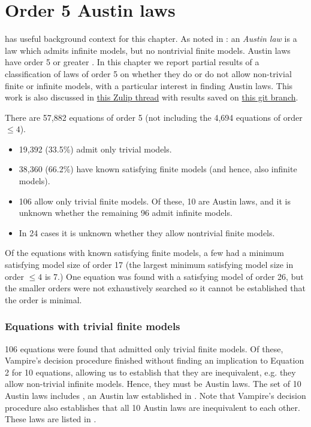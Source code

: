 \chapter{Order 5 Austin laws}\label{order-5-austin-laws}

 has useful background context for this chapter.
As noted in : an \emph{Austin law} is a law which admits infinite models, but no nontrivial finite models. Austin laws have order 5 or greater \cite{Kisielewicz2}.
In this chapter we report partial results of a classification of laws of order 5 on whether they do or do not allow non-trivial finite or infinite models, with a particular interest in finding Austin laws.
This work is also discussed in \href{https://leanprover.zulipchat.com/#narrow/channel/458659-Equational/topic/Some.20results.20from.20order.205/near/482118667}{this Zulip thread} with results saved on \href{https://github.com/vlad902/equational_theories/tree/order5}{this git branch}.

There are 57,882 equations of order 5 (not including the 4,694 equations of order $\le 4$).
\begin{itemize}
  \item 19,392 (33.5\%) admit only trivial models.
  \item 38,360 (66.2\%) have known satisfying finite models (and hence, also infinite models).
  \item 106 allow only trivial finite models. Of these, 10 are Austin laws, and it is unknown whether the remaining 96 admit infinite models.
  \item In 24 cases it is unknown whether they allow nontrivial finite models.
\end{itemize}

Of the equations with known satisfying finite models, a few had a minimum satisfying model size of order 17 (the largest minimum satisfying model size in order $\le 4$ is 7.) One equation was found with a satisfying model of order 26, but the smaller orders were not exhaustively searched so it cannot be established that the order is minimal.

\subsection{Equations with trivial finite models}

106 equations were found that admitted only trivial finite models. Of these, Vampire's decision procedure finished without finding an implication to Equation 2 for 10 equations, allowing us to establish that they are inequivalent, e.g. they allow non-trivial infinite models.
Hence, they must be Austin laws.
The set of 10 Austin laws includes , an Austin law established in \cite{Kisielewicz2}.
Note that Vampire's decision procedure also establishes that all 10 Austin laws are inequivalent to each other.
These laws are listed in .

